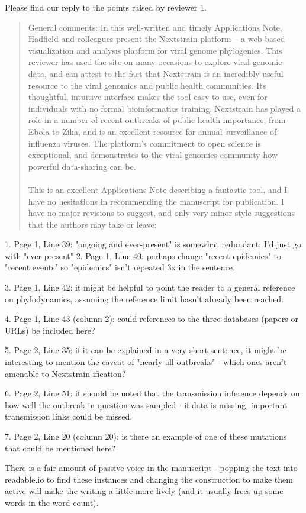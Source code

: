 \documentclass[12pt,a4paper]{article}
\begin{document}
Please find our reply to the points raised by reviewer 1.

\begin{quotation}
General comments:
In this well-written and timely Applications Note, Hadfield and colleagues present the Nextstrain platform – a web-based visualization and analysis platform for viral genome phylogenies. This reviewer has used the site on many occasions to explore viral genomic data, and can attest to the fact that Nextstrain is an incredibly useful resource to the viral genomics and public health communities. Its thoughtful, intuitive interface makes the tool easy to use, even for individuals with no formal bioinformatics training. Nextstrain has played a role in a number of recent outbreaks of public health importance, from Ebola to Zika, and is an excellent resource for annual surveillance of influenza viruses. The platform's commitment to open science is exceptional, and demonstrates to the viral genomics community how powerful data-sharing can be.

\paragraph{}
This is an excellent Applications Note describing a fantastic tool, and I have no hesitations in recommending the manuscript for publication. I have no major revisions to suggest, and only very minor style suggestions that the authors may take or leave:

\end{quotation}


1. Page 1, Line 39: "ongoing and ever-present" is somewhat redundant; I'd just go with "ever-present"
2. Page 1, Line 40: perhaps change "recent epidemics" to "recent events" so "epidemics" isn't repeated 3x in the sentence.

3. Page 1, Line 42: it might be helpful to point the reader to a general reference on phylodynamics, assuming the reference limit hasn't already been reached.

4. Page 1, Line 43 (column 2): could references to the three databases (papers or URLs) be included here?

5. Page 2, Line 35: if it can be explained in a very short sentence, it might be interesting to mention the caveat of "nearly all outbreaks" - which ones aren't amenable to Nextstrain-ification?

6. Page 2, Line 51: it should be noted that the transmission inference depends on how well the outbreak in question was sampled - if data is missing, important transmission links could be missed.

7. Page 2, Line 20 (column 20): is there an example of one of these mutations that could be mentioned here?

There is a fair amount of passive voice in the manuscript - popping the text into readable.io to find these instances and changing the construction to make them active will make the writing a little more lively (and it usually frees up some words in the word count).
\end{document}
